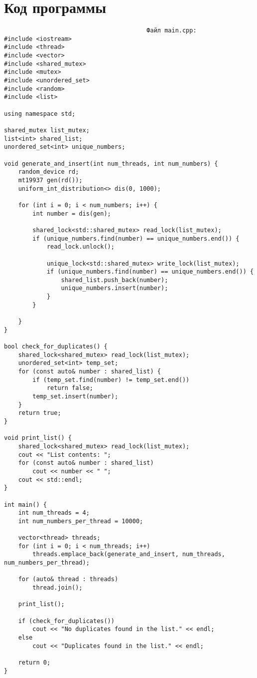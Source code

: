 \documentclass[a4paper, 14pt]{extarticle}
\begin{document}
\section{Код программы}
\begin{verbatim}
                                        Файл main.cpp:
#include <iostream>
#include <thread>
#include <vector>
#include <shared_mutex>
#include <mutex>
#include <unordered_set>
#include <random>
#include <list>

using namespace std;

shared_mutex list_mutex;
list<int> shared_list;
unordered_set<int> unique_numbers;

void generate_and_insert(int num_threads, int num_numbers) {
    random_device rd;
    mt19937 gen(rd());
    uniform_int_distribution<> dis(0, 1000);

    for (int i = 0; i < num_numbers; i++) {
        int number = dis(gen);

        shared_lock<std::shared_mutex> read_lock(list_mutex);
        if (unique_numbers.find(number) == unique_numbers.end()) {
            read_lock.unlock();

            unique_lock<std::shared_mutex> write_lock(list_mutex);
            if (unique_numbers.find(number) == unique_numbers.end()) {
                shared_list.push_back(number);
                unique_numbers.insert(number);
            }
        }
        
    }
}

bool check_for_duplicates() {
    shared_lock<shared_mutex> read_lock(list_mutex);
    unordered_set<int> temp_set;
    for (const auto& number : shared_list) {
        if (temp_set.find(number) != temp_set.end()) 
            return false;
        temp_set.insert(number);
    }
    return true;
}

void print_list() {
    shared_lock<shared_mutex> read_lock(list_mutex);
    cout << "List contents: ";
    for (const auto& number : shared_list) 
        cout << number << " ";
    cout << std::endl;
}

int main() {
    int num_threads = 4;
    int num_numbers_per_thread = 10000;

    vector<thread> threads;
    for (int i = 0; i < num_threads; i++) 
        threads.emplace_back(generate_and_insert, num_threads, num_numbers_per_thread);

    for (auto& thread : threads) 
        thread.join();
    
    print_list();

    if (check_for_duplicates()) 
        cout << "No duplicates found in the list." << endl;
    else 
        cout << "Duplicates found in the list." << endl;

    return 0;
}
\end{verbatim}
\end{document}
